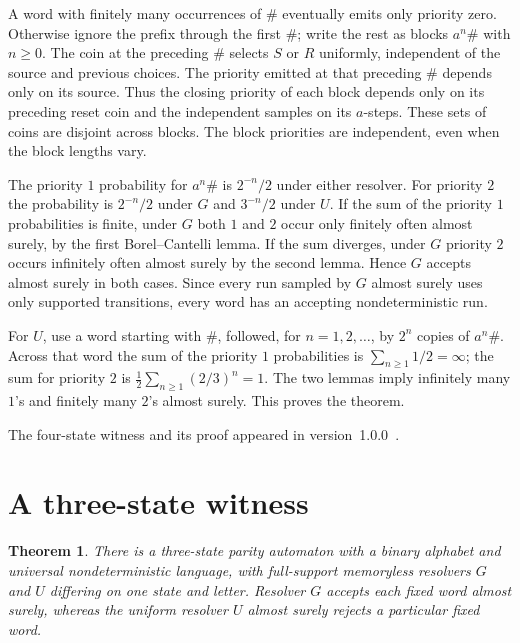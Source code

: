 \documentclass[11pt]{amsart}
\newtheorem{theorem}{Theorem}
\begin{document}
A word with finitely many occurrences of \(\#\) eventually emits only priority zero. Otherwise ignore the prefix through the first \(\#\); write the rest as blocks \(a^n\#\) with \(n\geq 0\). The coin at the preceding \(\#\) selects \(S\) or \(R\) uniformly, independent of the source and previous choices. The priority emitted at that preceding \(\#\) depends only on its source. Thus the closing priority of each block depends only on its preceding reset coin and the independent samples on its \(a\)-steps. These sets of coins are disjoint across blocks. The block priorities are independent, even when the block lengths vary.

The priority \(1\) probability for \(a^n\#\) is \(2^{-n}/2\) under either resolver. For priority \(2\) the probability is \(2^{-n}/2\) under \(G\) and \(3^{-n}/2\) under \(U\). If the sum of the priority \(1\) probabilities is finite, under \(G\) both \(1\) and \(2\) occur only finitely often almost surely, by the first Borel--Cantelli lemma. If the sum diverges, under \(G\) priority \(2\) occurs infinitely often almost surely by the second lemma. Hence \(G\) accepts almost surely in both cases. Since every run sampled by \(G\) almost surely uses only supported transitions, every word has an accepting nondeterministic run.

For \(U\), use a word starting with \(\#\), followed, for \(n=1,2,\ldots\), by \(2^n\) copies of \(a^n\#\). Across that word the sum of the priority \(1\) probabilities is \(\sum_{n\geq1}1/2=\infty\); the sum for priority \(2\) is \(\frac12\sum_{n\geq1}(2/3)^n=1\). The two lemmas imply infinitely many \(1\)'s and finitely many \(2\)'s almost surely. This proves the theorem.

The four-state witness and its proof appeared in version~1.0.0~\cite{V1}.

\section{A three-state witness}\label{sec:three}

\begin{theorem}\label{thm:three}
There is a three-state parity automaton with a binary alphabet and universal nondeterministic language, with full-support memoryless resolvers \(G\) and \(U\) differing on one state and letter. Resolver \(G\) accepts each fixed word almost surely, whereas the uniform resolver \(U\) almost surely rejects a particular fixed word.
\end{theorem}
\end{document}
